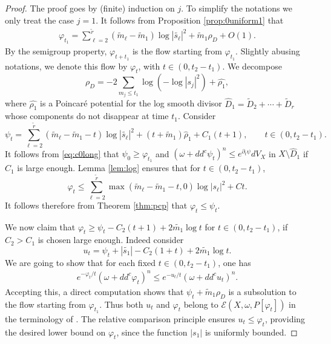 \documentclass[11pt]{amsart}
\numberwithin{equation}{section}
\newcommand{\f}{\varphi}
\newcommand{\p}{\psi}
\begin{document}
\begin{proof}
The proof goes by (finite) induction on $j$. To simplify the notations we only 
treat the case $j=1$. It follows from Proposition \ref{prop:0uniform1} that
\begin{eqnarray} \label{eq:c0long}
\f_{t_1}=\sum_{\ell=2}^{\tilde{r}} (\tilde{m}_{\ell}-\tilde{m}_{1}) \log |\tilde{s_\ell}|^2 +\tilde{m}_{1} {\rho}_D+O(1).
\end{eqnarray}
By the semigroup property, $\varphi_{t+t_1}$ is the flow starting from $\varphi_{t_1}$. Slightly abusing notations, 
we denote this flow by $\varphi_t$, with $t\in (0, t_2-t_1)$.
We decompose 
\[
{\rho}_D=-2 \sum_{m_j \leq t_1} \log (-\log |s_j|^2)+\hat{\rho_1},
\]
where
$\hat{\rho_1}$ is a Poincaré potential for the log smooth divisor 
$\hat{D}_1=\tilde{D}_{2} + \cdots + \tilde{D}_r$ 
whose components do not disappear at time $t_1$.
Consider
$$
\p_t=\sum_{\ell=2}^{\tilde{r}} (\tilde{m}_{\ell}-\tilde{m}_{1}-t) \log |\tilde{s_\ell}|^2 +(t+\tilde{m}_{1}) \hat{\rho}_1+C_1(t+1),  \qquad  t\in(0, t_2-t_1).
$$
It follows from \eqref{eq:c0long} that $\p_{0} \geq \f_{t_1}$
and $(\omega+dd^c \p_t)^n \leq e^{\partial_t \p} dV_X$ in $X \setminus \hat{D}_1$ if $C_1$ is large enough.
Lemma \ref{lem:log} ensures that for $t\in (0, t_2-t_1)$, 
\[
\varphi_t\leq \sum_{\ell=2}^{\tilde{r}} \max(\tilde{m}_\ell- \tilde{m}_1- t,0) \log |s_\ell|^2 +Ct.
\]
It follows therefore from Theorem \ref{thm:pcp} that $\f_t \leq \p_t$.

\smallskip

We now claim that 
$\f_t  \geq \p_t-C_2 (t+1)+2\tilde{m_1} \log t$
for $t \in (0,t_2-t_1)$, if $C_2>C_1$ is chosen large enough. Indeed consider 
$$
u_t=\p_t+|\tilde{s_1}|-C_2(1+t)+2\tilde{m_1} \log t.
$$
We are going to show that for each fixed $t \in (0,t_2-t_1)$, one has
\begin{eqnarray} \label{eq:MAelliptic}
e^{-{\f_t}/{t}}(\omega+dd^c \f_t)^n \leq e^{-{u_t}/{t}}(\omega+dd^c u_t)^n.
\end{eqnarray}
Accepting this, a direct computation shows that $\psi_t + \tilde{m}_1\rho_D$ is a subsolution to the flow starting from $\varphi_{t_1}$. Thus both $u_t$ and $\varphi_t$ belong to $ \mathcal{E}(X, \omega, P[\varphi_t])$ in the terminology of \cite{DDL2}. 
The relative comparison principle \cite[Corollary 3.6]{DDL2}  ensures  $u_t \leq \f_t$, 
providing the desired lower bound on $\f_t$, since the function $|s_1|$ is uniformly bounded.

\smallskip


\end{proof}
\end{document}
